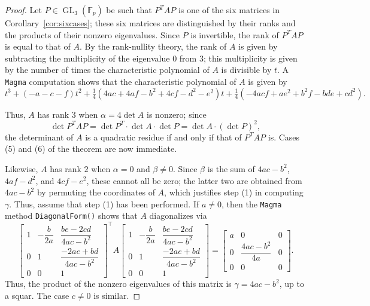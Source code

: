 \documentclass[10pt,a4paper]{amsart}
\numberwithin{equation}{section}
\numberwithin{figure}{section}
\theoremstyle{definition}
\theoremstyle{remark}
\theoremstyle{plain}
\theoremstyle{plain}
\theoremstyle{definition}
\theoremstyle{plain}
\theoremstyle{plain}
\newcommand{\F}{\mathbb{F}}
\newcommand{\GL}{\operatorname{GL}}
\begin{document}
	\begin{proof}
	Let $P\in\GL_3(\F_p)$ be such that $P^TAP$ is one of the six matrices in Corollary~\ref{cor:sixcases}; these six matrices are distinguished by their ranks and the products of their nonzero eigenvalues. Since $P$ is invertible, the rank of $P^TAP$ is equal to that of $A$. By the rank-nullity theory, the rank of $A$ is given by subtracting the multiplicity of the eigenvalue $0$ from $3$; this multiplicity is given by the number of times the characteristic polynomial of $A$ is divisible by $t$. A \texttt{Magma} \cite{magma} computation shows that the characteristic polynomial of $A$ is given by
	\begin{equation*}
	t^3+(-a-c-f)t^2+\tfrac{1}{4}(4ac+4af-b^2+4cf-d^2-e^2)t+\tfrac{1}{4}(-4acf+ae^2+b^2f-bde+cd^2).
	\end{equation*}
	
	Thus, $A$ has rank $3$ when $\alpha=4\det A$ is nonzero; since
	\begin{equation*}
	\det P^TAP=\det P^T\cdot\det A\cdot\det P=\det A\cdot(\det P)^2,
	\end{equation*}
	the determinant of $A$ is a quadratic residue if and only if that of $P^TAP$ is. Cases (5) and (6) of the theorem are now immediate.
	
	Likewise, $A$ has rank $2$ when $\alpha=0$ and $\beta\ne 0$. Since $\beta$ is the sum of $4ac-b^2$, $4af-d^2$, and $4cf-e^2$, these cannot all be zero; the latter two are obtained from $4ac-b^2$ by permuting the coordinates of $A$, which justifies step (1) in computing $\gamma$. Thus, assume that step (1) has been performed. If $a\ne 0$, then the \texttt{Magma} method \texttt{DiagonalForm()} shows that $A$ diagonalizes via
	\begin{equation*}
		\begin{bmatrix}
			1 & -\dfrac{b}{2a} & \dfrac{be - 2cd}{4ac - b^2}\\
			0 & 1 & \dfrac{-2ae + bd}{4ac - b^2} \\
			0 & 0 & 1
		\end{bmatrix}^\top
		A
		\begin{bmatrix}
			1 & -\dfrac{b}{2a} & \dfrac{be - 2cd}{4ac - b^2}\\
			0 & 1 & \dfrac{-2ae + bd}{4ac - b^2} \\
			0 & 0 & 1
		\end{bmatrix}
		=
		\begin{bmatrix}
		a&0&0\\
		0&\dfrac{4ac-b^2}{4a}&0\\
		0&0&0
		\end{bmatrix}.
	\end{equation*}
	Thus, the product of the nonzero eigenvalues of this matrix is $\gamma=4ac-b^2$, up to a squar. The case $c\ne 0$ is similar.
	

\end{proof}
\end{document}
